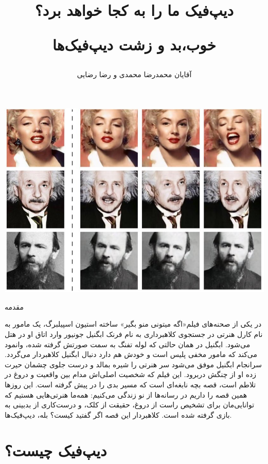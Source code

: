 \documentclass[12pt,a4paper]{report}
\title{دیپ‌فیک ما را به کجا خواهد برد؟
 	
 	 خوب،بد و زشت دیپ‌فیک‌ها}
\author{ آقایان محمدرضا محمدی و رضا رضایی}
\begin{document}
	\thisfancypage{\setlength{\fboxsep}{10pt}\doublebox}{}
	

 	\maketitle
 	\tableofcontents
	
	
	\includegraphics[width=1 \textwidth]{images/firstPic.jpeg}
	
 	
 	
 	\vspace{20pt}
 	
 	{\LARGE  مقدمه }
 	
 	{\large در یکی از صحنه‌های فیلم«اگه میتونی منو بگیر»  ساخته استیون اسپیلبرگ، یک مامور    به نام کارل هنرتی در جستجوی کلاهبرداری به نام فرنک ابگنیل جونیور وارد اتاق او در هتل می‌شود. ابگنیل در همان حالتی که لوله تفنگ به سمت صورتش گرفته شده، وانمود می‌کند که مامور مخفی پلیس است و خودش هم دارد دنبال ابگنیل کلاهبردار می‌گردد. سرانجام ابگنیل موفق می‌شود سر هنرتی را شیره بمالد و درست جلوی چشمان حیرت زده او از چنگش دربرود. این فیلم که شخصیت اصلی‌اش مدام بین واقعیت و دروغ در تلاطم است، قصه بچه نابغه‌ای است که مسیر بدی را در پیش گرفته است. این روزها همین قصه را داریم در رسانه‌ها از نو زندگی می‌کنیم: همه‌ما هنرتی‌هایی هستیم که توانایی‌مان برای تشخیص راست از دروغ، حقیقت از کلک، و درست‌کاری از بدبینی به بازی گرفته شده است. کلاهبردار این قصه اگر گفتید کیست؟ بله، دیپ‌فیک‌ها.
 	}
 	
\chapter{دیپ‌فیک چیست؟}\label{فصل اول }
\end{document}
